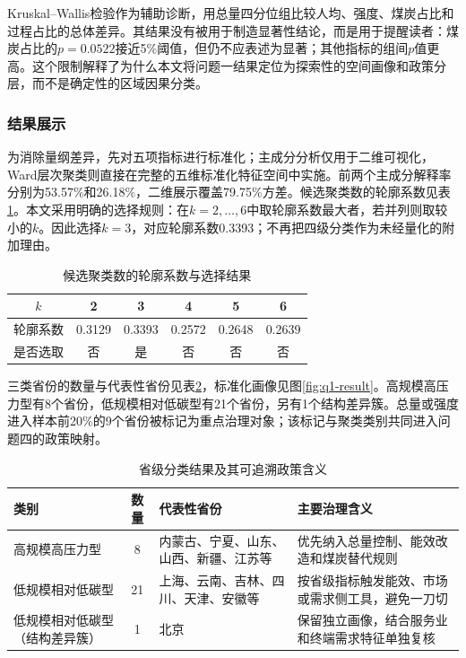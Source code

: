 \documentclass[12pt,a4paper]{ctexart}
\theoremstyle{definition}
\theoremstyle{plain}
\theoremstyle{remark}
\begin{document}
Kruskal--Wallis检验作为辅助诊断，用总量四分位组比较人均、强度、煤炭占比和过程占比的总体差异。其结果没有被用于制造显著性结论，而是用于提醒读者：煤炭占比的$p=0.0522$接近5\%阈值，但仍不应表述为显著；其他指标的组间$p$值更高。这个限制解释了为什么本文将问题一结果定位为探索性的空间画像和政策分层，而不是确定性的区域因果分类。
\subsubsection{结果展示}
为消除量纲差异，先对五项指标进行标准化；主成分分析仅用于二维可视化，Ward层次聚类则直接在完整的五维标准化特征空间中实施\cite{ward}。前两个主成分解释率分别为53.57\%和26.18\%，二维展示覆盖79.75\%方差。候选聚类数的轮廓系数见表\ref{tab:silhouette}。本文采用明确的选择规则：在$k=2,\ldots,6$中取轮廓系数最大者，若并列则取较小的$k$。因此选择$k=3$，对应轮廓系数0.3393；不再把四级分类作为未经量化的附加理由。

\begin{table}[H]
\centering
\caption{候选聚类数的轮廓系数与选择结果}
\label{tab:silhouette}
\begin{tabular}{cccccc}
\toprule
$k$ & 2 & 3 & 4 & 5 & 6\\
\midrule
轮廓系数 & 0.3129 & 0.3393 & 0.2572 & 0.2648 & 0.2639\\
是否选取 & 否 & 是 & 否 & 否 & 否\\
\bottomrule
\end{tabular}
\end{table}

三类省份的数量与代表性省份见表\ref{tab:cluster}，标准化画像见图\ref{fig:q1-result}。高规模高压力型有8个省份，低规模相对低碳型有21个省份，另有1个结构差异簇。总量或强度进入样本前20\%的9个省份被标记为重点治理对象；该标记与聚类类别共同进入问题四的政策映射。

\begin{table}[H]
\centering
\caption{省级分类结果及其可追溯政策含义}
\label{tab:cluster}
\begin{tabular}{>{\raggedright\arraybackslash}p{3.4cm}c>{\raggedright\arraybackslash}p{4.6cm}>{\raggedright\arraybackslash}p{3.0cm}}
\toprule
类别 & 数量 & 代表性省份 & 主要治理含义\\
\midrule
高规模高压力型 & 8 & 内蒙古、宁夏、山东、山西、新疆、江苏等 & 优先纳入总量控制、能效改造和煤炭替代规则\\
低规模相对低碳型 & 21 & 上海、云南、吉林、四川、天津、安徽等 & 按省级指标触发能效、市场或需求侧工具，避免一刀切\\
低规模相对低碳型（结构差异簇） & 1 & 北京 & 保留独立画像，结合服务业和终端需求特征单独复核\\
\bottomrule
\end{tabular}
\end{table}
\end{document}
